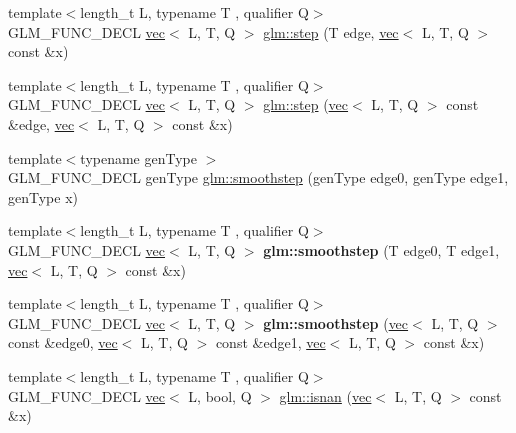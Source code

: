 \begin{DoxyCompactItemize}
\item 
{\footnotesize template$<$length\+\_\+t L, typename T , qualifier Q$>$ }\\G\+L\+M\+\_\+\+F\+U\+N\+C\+\_\+\+D\+E\+CL \hyperlink{structglm_1_1vec}{vec}$<$ L, T, Q $>$ \hyperlink{group__core__func__common_ga8f9a911a48ef244b51654eaefc81c551}{glm\+::step} (T edge, \hyperlink{structglm_1_1vec}{vec}$<$ L, T, Q $>$ const \&x)
\item 
{\footnotesize template$<$length\+\_\+t L, typename T , qualifier Q$>$ }\\G\+L\+M\+\_\+\+F\+U\+N\+C\+\_\+\+D\+E\+CL \hyperlink{structglm_1_1vec}{vec}$<$ L, T, Q $>$ \hyperlink{group__core__func__common_gaf4a5fc81619c7d3e8b22f53d4a098c7f}{glm\+::step} (\hyperlink{structglm_1_1vec}{vec}$<$ L, T, Q $>$ const \&edge, \hyperlink{structglm_1_1vec}{vec}$<$ L, T, Q $>$ const \&x)
\item 
{\footnotesize template$<$typename gen\+Type $>$ }\\G\+L\+M\+\_\+\+F\+U\+N\+C\+\_\+\+D\+E\+CL gen\+Type \hyperlink{group__core__func__common_ga562edf7eca082cc5b7a0aaf180436daf}{glm\+::smoothstep} (gen\+Type edge0, gen\+Type edge1, gen\+Type x)
\item 
\mbox{\label{group__core__func__common_gade789a876643ff09880a2714d398b06f}} 
{\footnotesize template$<$length\+\_\+t L, typename T , qualifier Q$>$ }\\G\+L\+M\+\_\+\+F\+U\+N\+C\+\_\+\+D\+E\+CL \hyperlink{structglm_1_1vec}{vec}$<$ L, T, Q $>$ {\bfseries glm\+::smoothstep} (T edge0, T edge1, \hyperlink{structglm_1_1vec}{vec}$<$ L, T, Q $>$ const \&x)
\item 
\mbox{\label{group__core__func__common_ga86a29708af325a4cd7d75cf5bdc8c3f8}} 
{\footnotesize template$<$length\+\_\+t L, typename T , qualifier Q$>$ }\\G\+L\+M\+\_\+\+F\+U\+N\+C\+\_\+\+D\+E\+CL \hyperlink{structglm_1_1vec}{vec}$<$ L, T, Q $>$ {\bfseries glm\+::smoothstep} (\hyperlink{structglm_1_1vec}{vec}$<$ L, T, Q $>$ const \&edge0, \hyperlink{structglm_1_1vec}{vec}$<$ L, T, Q $>$ const \&edge1, \hyperlink{structglm_1_1vec}{vec}$<$ L, T, Q $>$ const \&x)
\item 
{\footnotesize template$<$length\+\_\+t L, typename T , qualifier Q$>$ }\\G\+L\+M\+\_\+\+F\+U\+N\+C\+\_\+\+D\+E\+CL \hyperlink{structglm_1_1vec}{vec}$<$ L, bool, Q $>$ \hyperlink{group__core__func__common_ga29ef934c00306490de837b4746b4e14d}{glm\+::isnan} (\hyperlink{structglm_1_1vec}{vec}$<$ L, T, Q $>$ const \&x)

\end{DoxyCompactItemize}
